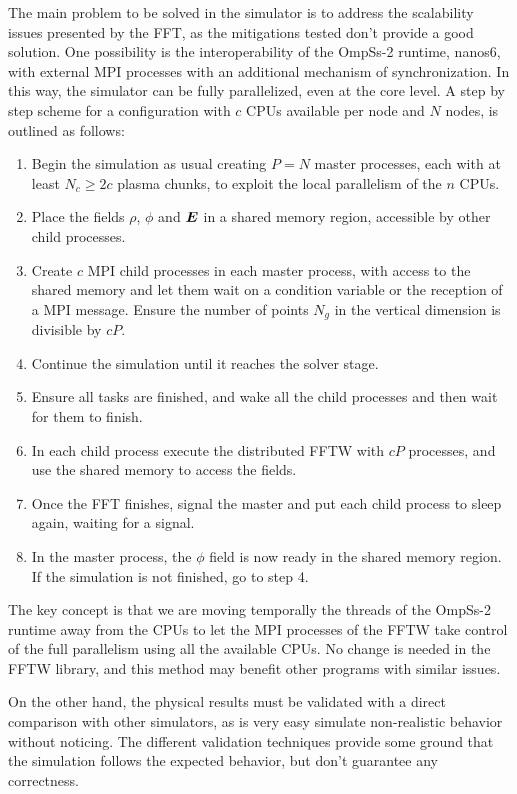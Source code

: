 The main problem to be solved in the simulator is to address the scalability 
issues presented by the FFT, as the mitigations tested don't provide a good 
solution. One possibility is the interoperability of the OmpSs-2 runtime, 
nanos6, with external MPI processes with an additional mechanism of 
synchronization. In this way, the simulator can be fully parallelized, even at 
the core level. A step by step scheme for a configuration with $c$ CPUs 
available per node and $N$ nodes, is outlined as follows:
%
\begin{enumerate}
\item Begin the simulation as usual creating $P = N$ master processes, each with 
at least $N_c \ge 2c$ plasma chunks, to exploit the local parallelism of the $n$ 
CPUs.
\item Place the fields $\rho$, $\phi$ and $\bm{E}$ in a shared memory region, 
accessible by other child processes.
\item Create $c$ MPI child processes in each master process, with access to the 
shared memory and let them wait on a condition variable or the reception of a 
MPI message.  Ensure the number of points $N_g$ in the vertical dimension is 
divisible by $cP$.
\item Continue the simulation until it reaches the solver stage.
\item Ensure all tasks are finished, and wake all the child processes and then 
wait for them to finish.
\item In each child process execute the distributed FFTW with $cP$ processes, 
and use the shared memory to access the fields.
\item Once the FFT finishes, signal the master and put each child process to 
sleep again, waiting for a signal.
\item In the master process, the $\phi$ field is now ready in the shared memory 
region. If the simulation is not finished, go to step 4.
\end{enumerate}
%
The key concept is that we are moving temporally the threads of the OmpSs-2 
runtime away from the CPUs to let the MPI processes of the FFTW take control of 
the full parallelism using all the available CPUs. No change is needed in the 
FFTW library, and this method may benefit other programs with similar issues.

On the other hand, the physical results must be validated with a direct 
comparison with other simulators, as is very easy simulate non-realistic 
behavior without noticing. The different validation techniques provide some 
ground that the simulation follows the expected behavior, but don't guarantee 
any correctness.

